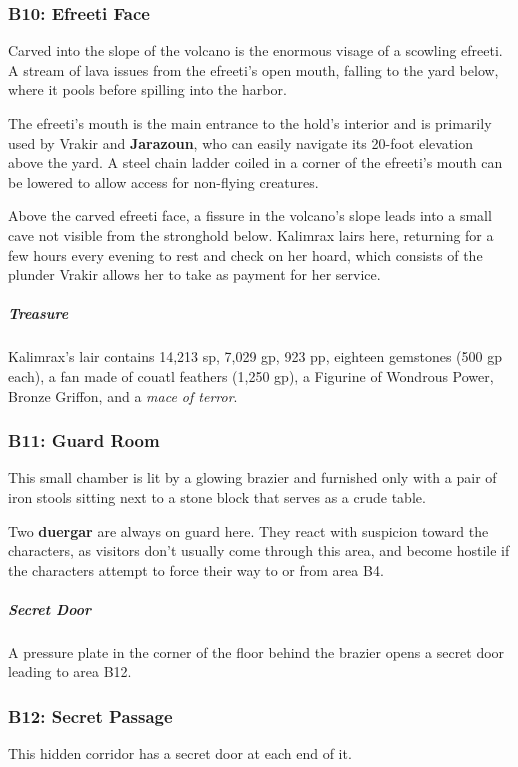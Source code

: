 \documentclass[10pt,a4paper,twoside,bg=print,twocolumn,openany,nodeprecatedcode]{dndbook}
\begin{document}
\subsubsection{B10: Efreeti Face}
\begin{DndReadAloud}{}
Carved into the slope of the volcano is the enormous visage of a scowling efreeti. A stream of lava issues from the efreeti's open mouth, falling to the yard below, where it pools before spilling into the harbor.

\end{DndReadAloud}

The efreeti's mouth is the main entrance to the hold's interior and is primarily used by Vrakir and \textbf{Jarazoun}, who can easily navigate its 20-foot elevation above the yard. A steel chain ladder coiled in a corner of the efreeti's mouth can be lowered to allow access for non-flying creatures.

Above the carved efreeti face, a fissure in the volcano's slope leads into a small cave not visible from the stronghold below. Kalimrax lairs here, returning for a few hours every evening to rest and check on her hoard, which consists of the plunder Vrakir allows her to take as payment for her service.

\subparagraph{Treasure}
Kalimrax's lair contains 14,213 sp, 7,029 gp, 923 pp, eighteen gemstones (500 gp each), a fan made of couatl feathers (1,250 gp), a Figurine of Wondrous Power, Bronze Griffon, and a \textit{mace of terror}.

\subsubsection{B11: Guard Room}
This small chamber is lit by a glowing brazier and furnished only with a pair of iron stools sitting next to a stone block that serves as a crude table.

Two \textbf{duergar} are always on guard here. They react with suspicion toward the characters, as visitors don't usually come through this area, and become hostile if the characters attempt to force their way to or from area B4.

\subparagraph{Secret Door}
A pressure plate in the corner of the floor behind the brazier opens a secret door leading to area B12.

\subsubsection{B12: Secret Passage}
This hidden corridor has a secret door at each end of it.
\end{document}
